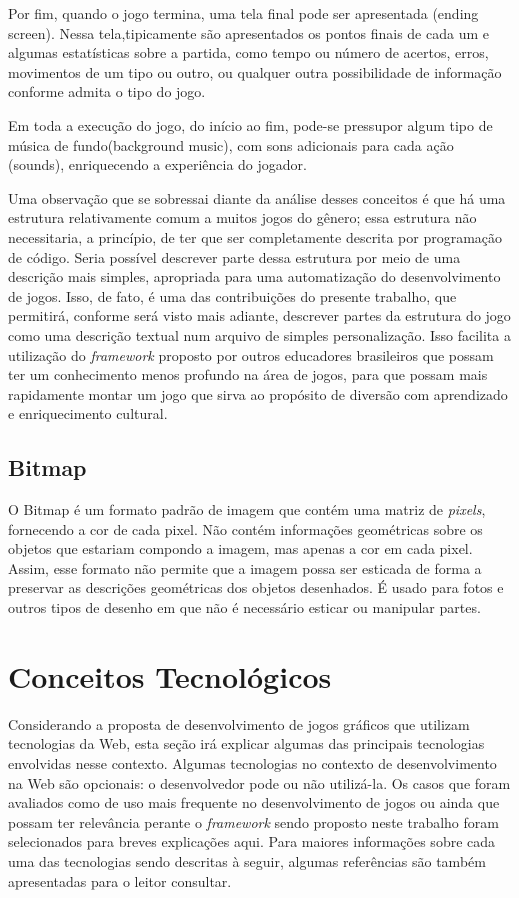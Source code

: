 Por fim, quando o jogo termina, uma tela final pode ser apresentada (ending screen). Nessa tela,tipicamente são apresentados os pontos finais de cada um e algumas estatísticas sobre a partida, como tempo ou número de acertos, erros, movimentos de um tipo ou outro, ou qualquer outra possibilidade de informação conforme admita o tipo do jogo.

Em toda a execução do jogo, do início ao fim, pode-se pressupor algum tipo de música de fundo(background music), com sons adicionais para cada ação (sounds), enriquecendo a experiência do jogador.

Uma observação que se sobressai diante da análise desses conceitos é que há uma estrutura relativamente comum a muitos jogos do gênero; essa estrutura não necessitaria, a princípio, de ter que ser completamente descrita por programação de código. Seria possível descrever parte dessa estrutura por meio de uma descrição mais simples, apropriada para uma automatização do desenvolvimento de jogos. Isso, de fato, é uma das contribuições do presente trabalho, que permitirá, conforme será visto mais adiante, descrever partes da estrutura do jogo como uma descrição textual num arquivo de simples personalização. Isso facilita a utilização do \textit{framework} proposto por outros educadores brasileiros que possam ter um conhecimento menos profundo na área de jogos, para que possam mais rapidamente montar um jogo que sirva ao propósito de diversão com aprendizado e enriquecimento cultural.

 \subsection{ Bitmap }

 O Bitmap é um formato padrão de imagem que contém uma matriz de \textit{pixels}, fornecendo a cor de cada pixel. Não contém informações geométricas sobre os objetos que estariam compondo a imagem, mas apenas a cor em cada pixel. Assim, esse formato não permite que a imagem possa ser esticada de forma a preservar as descrições geométricas dos objetos desenhados. É usado para fotos e outros tipos de desenho em que não é necessário esticar ou manipular partes.

\section{Conceitos Tecnológicos}

Considerando a proposta de desenvolvimento de jogos gráficos que utilizam tecnologias da Web, esta seção irá explicar algumas das principais tecnologias envolvidas nesse contexto. Algumas tecnologias no contexto de desenvolvimento na Web são opcionais: o desenvolvedor pode ou não utilizá-la. Os casos que foram avaliados como de uso mais frequente no desenvolvimento de jogos ou ainda que possam ter relevância perante o \textit{framework} sendo proposto neste trabalho foram selecionados para breves explicações aqui. Para maiores informações sobre cada uma das tecnologias sendo descritas à seguir, algumas referências são também apresentadas para o leitor consultar.

